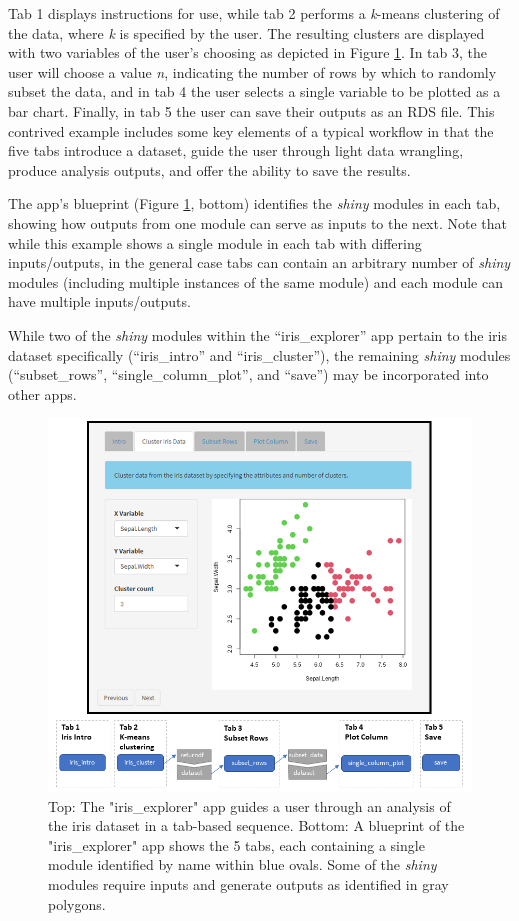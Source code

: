 Tab 1 displays instructions for use, while tab 2 performs a \emph{k}-means clustering of the data, where \emph{k} is specified by the user. The resulting clusters are displayed with two variables of the user's choosing as depicted in Figure \ref{fig:fig2}. In tab 3, the user will choose a value \emph{n}, indicating the number of rows by which to randomly subset the data, and in tab 4 the user selects a single variable to be plotted as a bar chart. Finally, in tab 5 the user can save their outputs as an RDS file. This contrived example includes some key elements of a typical workflow in that the five tabs introduce a dataset, guide the user through light data wrangling, produce analysis outputs, and offer the ability to save the results.

The app's blueprint (Figure \ref{fig:fig2}, bottom) identifies the \emph{shiny} modules in each tab, showing how outputs from one module can serve as inputs to the next. Note that while this example shows a single module in each tab with differing inputs/outputs, in the general case tabs can contain an arbitrary number of \emph{shiny} modules (including multiple instances of the same module) and each module can have multiple inputs/outputs.

While two of the \emph{shiny} modules within the ``iris\_explorer'' app pertain to the iris dataset specifically (``iris\_intro'' and ``iris\_cluster''), the remaining \emph{shiny} modules (``subset\_rows'', ``single\_column\_plot'', and ``save'') may be incorporated into other apps.

\begin{figure}[h]
\includegraphics[width=1\linewidth]{images/figure2} \caption{Top:  The "iris\_explorer" app guides a user through an analysis of the iris dataset in a tab-based sequence.  Bottom:  A blueprint of the "iris\_explorer" app shows the 5 tabs, each containing a single module identified by name within blue ovals. Some of the \textit{shiny} modules require inputs and generate outputs as identified in gray polygons.}\label{fig:fig2}
\end{figure}

